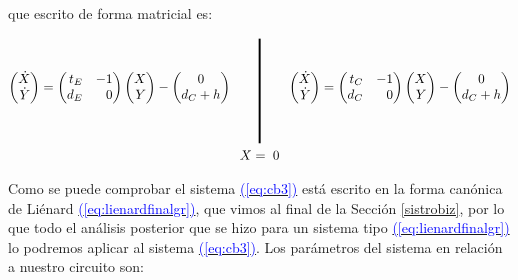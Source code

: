 \documentclass[12pt,a4paper]{report} %
\newcommand{\eref}[1]{\hyperref[#1]{\textcolor{blue}{(\ref*{#1})}}}
\newcommand{\eref}[1]{\hyperref[#1]{\textcolor{blue}{\textit{(\ref*{#1})}}}}
\begin{document}
	\vspace{0.5cm}\noindent que escrito de forma matricial es:
	
	\begin{equation}
		\label{eq:cb3}
		\begin{gathered}
			\begin{pmatrix*}[r]
				\dot{X}\\ \dot{Y}
			\end{pmatrix*}= \begin{pmatrix*}[r]
				t_E & -1 \\ d_E & 0
			\end{pmatrix*} \begin{pmatrix*}[r]
				X \\ Y
			\end{pmatrix*}-\begin{pmatrix*}[c]
				0 \\ d_C+h
			\end{pmatrix*} \qquad 
			\rule[-40pt]{1.5pt}{80pt} \qquad 
				\begin{pmatrix*}[r]
				\dot{X}\\ \dot{Y}
			\end{pmatrix*}= \begin{pmatrix*}[r]
				t_C & -1 \\ d_C & 0
			\end{pmatrix*} \begin{pmatrix*}[r]
				X \\ Y
			\end{pmatrix*}-\begin{pmatrix*}[c]
				0 \\ d_C+h
			\end{pmatrix*} \\ X=\;0
		\end{gathered}
	\end{equation}\smallskip
	
	\newpage
	
	\vspace{0.5cm} \noindent Como se puede comprobar el sistema \eref{eq:cb3} está escrito en la forma canónica de Liénard \eref{eq:lienardfinalgr}, que vimos al final de la Sección \ref{sistrobiz}, por lo que todo el análisis posterior que se hizo para un sistema tipo \eref{eq:lienardfinalgr} lo podremos aplicar al sistema \eref{eq:cb3}. Los parámetros del sistema en relación a nuestro circuito son:
	
\end{document}
